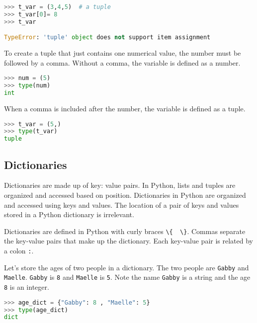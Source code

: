 \documentclass{book}
\newcommand{\passthrough}[1]{#1}
\begin{document}
\begin{lstlisting}[language=Python]
>>> t_var = (3,4,5)  # a tuple
>>> t_var[0]= 8
>>> t_var

TypeError: 'tuple' object does not support item assignment
\end{lstlisting}

To create a tuple that just contains one numerical value, the number
must be followed by a comma. Without a comma, the variable is defined as
a number.

\begin{lstlisting}[language=Python]
>>> num = (5)
>>> type(num)
int
\end{lstlisting}

When a comma is included after the number, the variable is defined as a
tuple.

\begin{lstlisting}[language=Python]
>>> t_var = (5,)
>>> type(t_var)
tuple
\end{lstlisting}
    




    
        \hypertarget{dictionaries}{%
\subsection{Dictionaries}\label{dictionaries}}
    




    
        Dictionaries are made up of key: value pairs. In Python, lists and
tuples are organized and accessed based on position. Dictionaries in
Python are organized and accessed using keys and values. The location of
a pair of keys and values stored in a Python dictionary is irrelevant.

Dictionaries are defined in Python with curly braces
\passthrough{\lstinline!\{  \}!}. Commas separate the key-value pairs
that make up the dictionary. Each key-value pair is related by a colon
\passthrough{\lstinline!:!}.

Let's store the ages of two people in a dictionary. The two people are
\passthrough{\lstinline!Gabby!} and \passthrough{\lstinline!Maelle!}.
\passthrough{\lstinline!Gabby!} is \passthrough{\lstinline!8!} and
\passthrough{\lstinline!Maelle!} is \passthrough{\lstinline!5!}. Note
the name \passthrough{\lstinline!Gabby!} is a string and the age
\passthrough{\lstinline!8!} is an integer.

\begin{lstlisting}[language=Python]
>>> age_dict = {"Gabby": 8 , "Maelle": 5}
>>> type(age_dict)
dict
\end{lstlisting}
\end{document}
